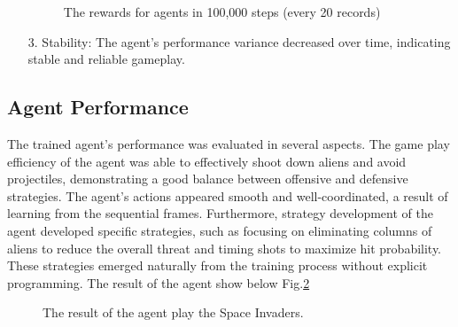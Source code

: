 \documentclass[preprint,12pt,3p,times]{elsarticle}
\begin{document}
\begin{enumerate}
\begin{figure}[!t]
\centering
{}
\caption{\label{figlabel3}The rewards for agents in 100,000 steps (every 20 records) }
\end{figure}

\item [3.]Stability: The agent's performance variance decreased over time, indicating stable and reliable gameplay.
\end{enumerate}

\subsection{Agent Performance}
The trained agent's performance was evaluated in several aspects. The game play efficiency of the agent was able to effectively shoot down aliens and avoid projectiles, demonstrating a good balance between offensive and defensive strategies. The agent's actions appeared smooth and well-coordinated, a result of learning from the sequential frames. Furthermore, strategy development of the agent developed specific strategies, such as focusing on eliminating columns of aliens to reduce the overall threat and timing shots to maximize hit probability. These strategies emerged naturally from the training process without explicit programming. The result of the agent show below Fig.\ref{figlabel4}

\begin{figure}[!t]
\centering
{}
\caption{\label{figlabel4}The result of the agent play the Space Invaders. }
\end{figure}
\end{document}
